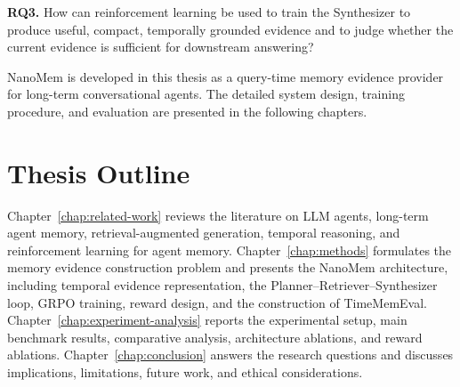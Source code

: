 \textbf{RQ3.} How can reinforcement learning be used to train the Synthesizer
to produce useful, compact, temporally grounded evidence and to judge whether
the current evidence is sufficient for downstream answering?

NanoMem is developed in this thesis as a query-time memory evidence provider
for long-term conversational agents. The detailed system design, training
procedure, and evaluation are presented in the following chapters.

\section{Thesis Outline}
\label{sec:intro-outline}

Chapter~\ref{chap:related-work} reviews the literature on LLM agents,
long-term agent memory, retrieval-augmented generation, temporal reasoning, and
reinforcement learning for agent memory. Chapter~\ref{chap:methods} formulates
the memory evidence construction problem and presents the NanoMem architecture,
including temporal evidence representation, the Planner--Retriever--Synthesizer
loop, GRPO training, reward design, and the construction of TimeMemEval.
Chapter~\ref{chap:experiment-analysis} reports the experimental setup, main
benchmark results, comparative analysis, architecture ablations, and reward
ablations. Chapter~\ref{chap:conclusion} answers the research questions and
discusses implications, limitations, future work, and ethical considerations.
